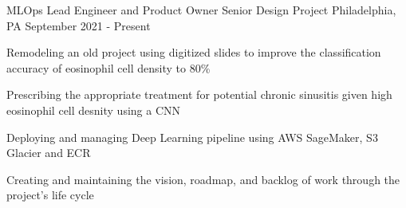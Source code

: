 
\begin{cventries}

	\cventry
	{MLOps Lead Engineer and Product Owner}
	{Senior Design Project}
	{Philadelphia, PA}
	{September 2021 - Present}
	{\begin{cvitems}
		\item {Remodeling an old project using digitized slides to improve the classification accuracy of eosinophil cell density to 80\%}
		\item {Prescribing the appropriate treatment for potential chronic sinusitis given high eosinophil cell desnity using a CNN}
		\item {Deploying and managing Deep Learning pipeline using AWS SageMaker, S3 Glacier and ECR }
		\item {Creating and maintaining the vision, roadmap, and backlog of work through the project's life cycle}
	\end{cvitems}}


\end{cventries}
